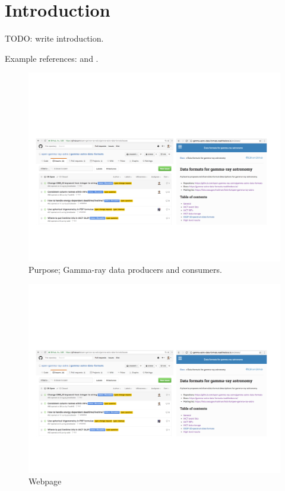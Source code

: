 \section{Introduction}

TODO: write introduction.

Example references: \cite{2015arXiv150907408D} and \citep{2016arXiv160600393K}.

\begin{figure}[tb]
  \centerline{\includegraphics[width=\textwidth]{figures/webpage}}
  \caption{Purpose; Gamma-ray data producers and consumers.}
\end{figure}

\begin{figure}[tb]
  \centerline{\includegraphics[width=\textwidth]{figures/webpage}}
  \caption{Webpage}
\end{figure}

